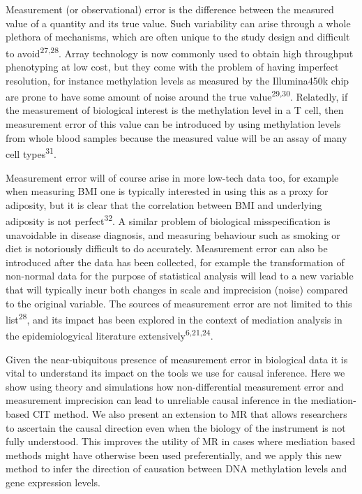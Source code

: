\documentclass[]{article}
\begin{document}
Measurement (or observational) error is the difference between the
measured value of a quantity and its true value. Such variability can
arise through a whole plethora of mechanisms, which are often unique to
the study design and difficult to avoid\textsuperscript{27,28}. Array
technology is now commonly used to obtain high throughput phenotyping at
low cost, but they come with the problem of having imperfect resolution,
for instance methylation levels as measured by the Illumina450k chip are
prone to have some amount of noise around the true
value\textsuperscript{29,30}. Relatedly, if the measurement of
biological interest is the methylation level in a T cell, then
measurement error of this value can be introduced by using methylation
levels from whole blood samples because the measured value will be an
assay of many cell types\textsuperscript{31}.

Measurement error will of course arise in more low-tech data too, for
example when measuring BMI one is typically interested in using this as
a proxy for adiposity, but it is clear that the correlation between BMI
and underlying adiposity is not perfect\textsuperscript{32}. A similar
problem of biological misspecification is unavoidable in disease
diagnosis, and measuring behaviour such as smoking or diet is
notoriously difficult to do accurately. Measurement error can also be
introduced after the data has been collected, for example the
transformation of non-normal data for the purpose of statistical
analysis will lead to a new variable that will typically incur both
changes in scale and imprecision (noise) compared to the original
variable. The sources of measurement error are not limited to this
list\textsuperscript{28}, and its impact has been explored in the
context of mediation analysis in the epidemiologyical literature
extensively\textsuperscript{6,21,24}.

Given the near-ubiquitous presence of measurement error in biological
data it is vital to understand its impact on the tools we use for causal
inference. Here we show using theory and simulations how
non-differential measurement error and measurement imprecision can lead
to unreliable causal inference in the mediation-based CIT method. We
also present an extension to MR that allows researchers to ascertain the
causal direction even when the biology of the instrument is not fully
understood. This improves the utility of MR in cases where mediation
based methods might have otherwise been used preferentially, and we
apply this new method to infer the direction of causation between DNA
methylation levels and gene expression levels.
\end{document}

